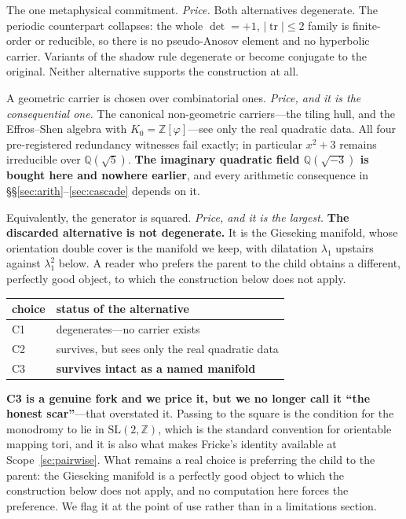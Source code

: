 \documentclass[11pt,reqno]{amsart}
\theoremstyle{plain}
\theoremstyle{definition}
\theoremstyle{remark}
\newcommand{\Q}{\mathbb{Q}}
\newcommand{\Z}{\mathbb{Z}}
\newcommand{\SL}{\mathrm{SL}}
\newcommand{\tr}{\operatorname{tr}}
\begin{document}
\begin{description}[leftmargin=1.6em,style=nextline]
\item[\textnormal{\textbf{(C1) Description is inexhaustible.}}] The one metaphysical
  commitment. \emph{Price.} Both alternatives degenerate. The periodic counterpart
  collapses: the whole $\det=+1$, $|\tr|\le2$ family is finite-order or reducible, so
  there is no pseudo-Anosov element and no hyperbolic carrier. Variants of the shadow
  rule degenerate or become conjugate to the original. Neither alternative supports the
  construction at all.
\item[\textnormal{\textbf{(C2) The word is realized on the once-punctured torus.}}] A
  geometric carrier is chosen over combinatorial ones. \emph{Price, and it is the
  consequential one.} The canonical non-geometric carriers---the tiling hull, and the
  Effros--Shen algebra with $K_0=\Z[\varphi]$---see only the real quadratic data. All
  four pre-registered redundancy witnesses fail exactly; in particular $x^2+3$ remains
  irreducible over $\Q(\sqrt5)$. \textbf{The imaginary quadratic field $\Q(\sqrt{-3})$
  is bought here and nowhere earlier}, and every arithmetic consequence in
  \S\S\ref{sec:arith}--\ref{sec:cascade} depends on it.
\item[\textnormal{\textbf{(C3) The monodromy is orientation-preserving.}}] Equivalently,
  the generator is squared. \emph{Price, and it is the largest.} \textbf{The discarded
  alternative is not degenerate.} It is the Gieseking manifold, whose orientation double
  cover is the manifold we keep, with dilatation $\lambda_1$ upstairs against
  $\lambda_1^2$ below. A reader who prefers the parent to the child obtains a different,
  perfectly good object, to which the construction below does not apply.
\end{description}

\begin{table}[h]
\centering
\begin{tabular}{@{}ll@{}}
\toprule
choice & status of the alternative\\
\midrule
C1 & degenerates---no carrier exists\\
C2 & survives, but sees only the real quadratic data\\
C3 & \textbf{survives intact as a named manifold}\\
\bottomrule
\end{tabular}
\end{table}

\textbf{C3 is a genuine fork and we price it, but we no longer call it ``the honest
scar''}---that overstated it. Passing to the square is the condition for the monodromy to
lie in $\SL(2,\Z)$, which is the standard convention for orientable mapping tori, and it
is also what makes Fricke's identity available at Scope~\ref{sc:pairwise}. What remains a
real choice is preferring the child to the parent: the Gieseking manifold is a perfectly
good object to which the construction below does not apply, and no computation here
forces the preference. We flag it at the point of use rather than in a limitations
section.
\end{document}
